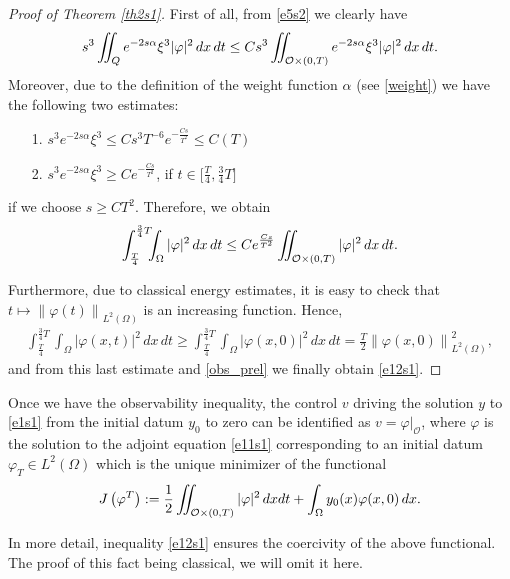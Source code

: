 \documentclass{amsart}    %
\newcommand{\norm}[2]{\left\|#1\right\|_{#2}}
\newcommand{\intd}{\displaystyle\int \kern -7pt \int}
\begin{document}
\begin{proof}[Proof of Theorem \ref{th2s1}]

First of all, from \eqref{e5s2} we clearly have
\begin{align*}
	s^3\intd_Q e^{-2s\alpha}\xi^3|\varphi|^2\,dx\,dt \leq C s^3\intd_{\mathcal O\times(0,T)} e^{-2s\alpha}\xi^3 |\varphi|^2\,dx\,dt.
\end{align*}
Moreover, due to the definition of the weight function $\alpha$ (see \eqref{weight}) we have the following two estimates:
\begin{enumerate}
	\item[1.] $s^3 e^{-2s\alpha}\xi^3 \leq Cs^3T^{-6}e^{-\frac{Cs}{T^2}}\leq C(T)$
	
	\item [2.] $s^3 e^{-2s\alpha}\xi^3 \geq Ce^{-\frac{Cs}{T^2}}$, if $t\in\Big[\frac T4,\frac 34 T\Big]$
\end{enumerate}
if we choose $s\geq CT^2$. Therefore, we obtain
\begin{align}\label{obs_prel}
	\int_{\frac T4}^{\frac 34 T}\!\!\!\int_\Omega |\varphi|^2\,dx\,dt \leq C e^{\frac {Cs}{T^2}}\intd_{\mathcal O\times(0,T)} |\varphi|^2\,dx\,dt.
\end{align}

Furthermore, due to classical energy estimates, it is easy to check that $t\mapsto \norm{\varphi(t)}{L^2(\Omega)}$ is an increasing function. Hence,
\begin{align*}
	\int_{\frac T4}^{\frac 34 T}\!\!\!\int_\Omega |\varphi(x,t)|^2\,dx\,dt \geq \int_{\frac T4}^{\frac 34 T}\!\!\!\int_\Omega |\varphi(x,0)|^2\,dx\,dt = \frac T2 \norm{\varphi(x,0)}{L^2(\Omega)}^2,
\end{align*}
and from this last estimate and \eqref{obs_prel} we finally obtain \eqref{e12s1}.
\end{proof}

Once we have the observability inequality, the control $v$ driving the solution $y$ to \eqref{e1s1} from the initial datum $y_0$ to zero can be identified as $v=\left.\varphi\right|_{\mathcal O}$, where $\varphi$ is the solution to the adjoint equation \eqref{e11s1} corresponding to an initial datum $\varphi_T\in L^2(\Omega)$ which is the unique minimizer of the functional
\begin{align}\label{functional_J}
	J\left(\varphi^T\right):= \frac 12\intd_{\mathcal O\times (0,T)} |\varphi|^2\,dxdt + \int_\Omega y_0(x)\varphi(x,0)\,dx.
\end{align}

In more detail, inequality \eqref{e12s1} ensures the coercivity of the above functional. The proof of this fact being classical, we will omit it here. 
\end{document}
